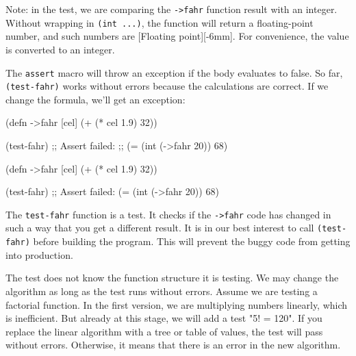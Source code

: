 
Note: in the test, we are comparing the \verb|->fahr| function result with an integer. Without wrapping in \verb|(int ...)|, the function will return a floating-point number, and such numbers are [Floating point][-6mm]. For convenience, the value is converted to an integer.

The \verb|assert| macro will throw an exception if the body evaluates to false. So far, \verb|(test-fahr)| works without errors because the calculations are correct. If we change the formula, we'll get an exception:

\ifnarrow

\begin{english}
  \begin{clojure}
(defn ->fahr [cel]
  (+ (* cel 1.9) 32))

(test-fahr)
;; Assert failed:
;; (= (int (->fahr 20)) 68)
  \end{clojure}
\end{english}

\else

\begin{english}
  \begin{clojure}
(defn ->fahr [cel]
  (+ (* cel 1.9) 32))

(test-fahr)
;; Assert failed: (= (int (->fahr 20)) 68)
  \end{clojure}
\end{english}

\fi

The \verb|test-fahr| function is a test. It checks if the \verb|->fahr| code has changed in such a way that you get a different result. It is in our best interest to call \verb|(test-fahr)| before building the program. This will prevent the buggy code from getting into production.


The test does not know the function structure it is testing. We may change the algorithm as long as the test runs without errors. Assume we are testing a factorial function. In the first version, we are multiplying numbers linearly, which is inefficient. But already at this stage, we will add a test "5! = 120". If you replace the linear algorithm with a tree or table of values, the test will pass without errors. Otherwise, it means that there is an error in the new algorithm.

